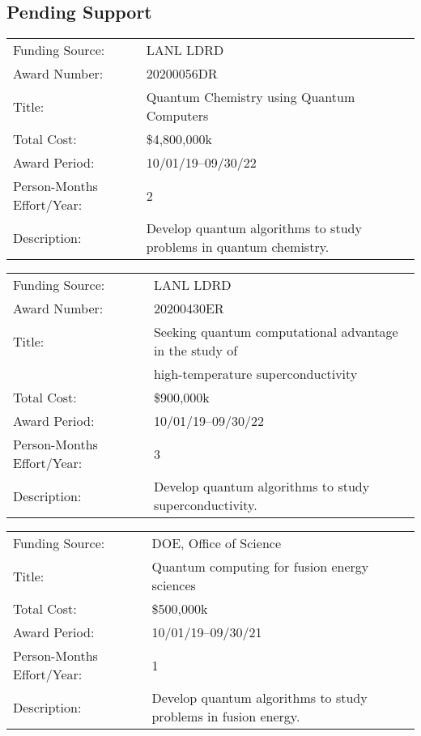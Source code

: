 \documentclass[10pt]{article}
\begin{document}
\subsection*{Pending Support}
\begin{description}

\item
\begin{tabularx}{\linewidth}{lX}
Funding Source: & LANL LDRD\\
Award Number: & 20200056DR\\
Title: &  Quantum Chemistry using Quantum Computers\\
Total Cost: & \$4,800,000k \\
Award Period: & 10/01/19--09/30/22 \\
Person-Months Effort/Year: & 2\\
Description: & Develop quantum algorithms to study problems in quantum chemistry.
\end{tabularx}


\item
\begin{tabularx}{\linewidth}{lX}
Funding Source: & LANL LDRD\\
Award Number: & 20200430ER\\
Title: &  Seeking quantum computational advantage in the study of \\
& high-temperature superconductivity\\
Total Cost: & \$900,000k \\
Award Period: & 10/01/19--09/30/22 \\
Person-Months Effort/Year: & 3\\
Description: & Develop quantum algorithms to study superconductivity.
\end{tabularx}

\item
\begin{tabularx}{\linewidth}{lX}
Funding Source: & DOE, Office of Science\\
Title: &  Quantum computing for fusion energy sciences\\
Total Cost: & \$500,000k \\
Award Period: & 10/01/19--09/30/21 \\
Person-Months Effort/Year: & 1\\
Description: & Develop quantum algorithms to study problems in fusion energy.
\end{tabularx}

\end{description}
\end{document}
